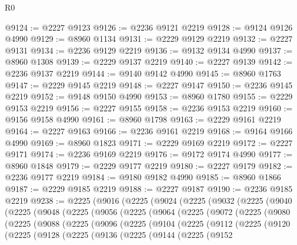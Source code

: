\begin{lexlean}{R0}
\begin{coremodule}
@9124 := @2227 @9123
@9126 := @2236 @9121 @2219
@9128 := @9124 @9126 @4990
@9129 := @8960 @1134
@9131 := @2229 @9129 @2219
@9132 := @2227 @9131
@9134 := @2236 @9129 @2219
@9136 := @9132 @9134 @4990
@9137 := @8960 @1308
@9139 := @2229 @9137 @2219
@9140 := @2227 @9139
@9142 := @2236 @9137 @2219
@9144 := @9140 @9142 @4990
@9145 := @8960 @1763
@9147 := @2229 @9145 @2219
@9148 := @2227 @9147
@9150 := @2236 @9145 @2219
@9152 := @9148 @9150 @4990
@9153 := @8960 @1780
@9155 := @2229 @9153 @2219
@9156 := @2227 @9155
@9158 := @2236 @9153 @2219
@9160 := @9156 @9158 @4990
@9161 := @8960 @1798
@9163 := @2229 @9161 @2219
@9164 := @2227 @9163
@9166 := @2236 @9161 @2219
@9168 := @9164 @9166 @4990
@9169 := @8960 @1823
@9171 := @2229 @9169 @2219
@9172 := @2227 @9171
@9174 := @2236 @9169 @2219
@9176 := @9172 @9174 @4990
@9177 := @8960 @1848
@9179 := @2229 @9177 @2219
@9180 := @2227 @9179
@9182 := @2236 @9177 @2219
@9184 := @9180 @9182 @4990
@9185 := @8960 @1866
@9187 := @2229 @9185 @2219
@9188 := @2227 @9187
@9190 := @2236 @9185 @2219
@9238 := @2225
    (@9016
      (@2225
        (@9024
          (@2225
            (@9032
              (@2225
                (@9040
                  (@2225
                    (@9048
                      (@2225
                        (@9056
                          (@2225
                            (@9064
                              (@2225
                                (@9072
                                  (@2225
                                    (@9080
                                      (@2225
                                        (@9088
                                          (@2225
                                            (@9096
                                              (@2225
                                                (@9104
                                                  (@2225
                                                    (@9112
                                                      (@2225
                                                        (@9120
                                                          (@2225
                                                            (@9128
                                                              (@2225
                                                                (@9136
                                                                  (@2225
                                                                    (@9144
                                                                      (@2225
                                                                        (@9152

\end{coremodule}
\end{lexlean}

